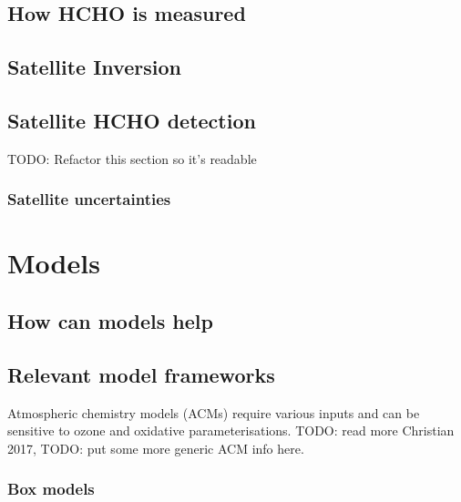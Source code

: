   \subsection{How HCHO is measured}
  
  \subsection{Satellite Inversion}
  
  \subsection{Satellite HCHO detection}
    \label{LR:HCHO:SatelliteDetection}
    TODO: Refactor this section so it's readable
     
    
      
    
    
    \subsubsection{Satellite uncertainties}
      
    
    
  
    
\section{Models}
  \label{LR:Models}
  \subsection{How can models help}
    
    
    
    
    
  \subsection{Relevant model frameworks}
  \label{LR:Models:frames}
    
    Atmospheric chemistry models (ACMs) require various inputs and can be sensitive to ozone and oxidative parameterisations. 
    TODO: read more Christian 2017,
    TODO: put some more generic ACM info here.
    
    \subsubsection{Box models} 
    \label{LR:Models:frames:box}
    

